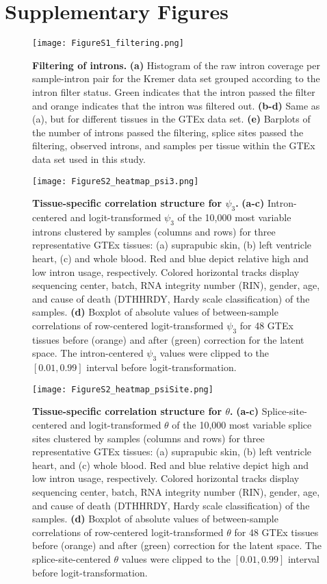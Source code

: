 \documentclass[a4paper,12pt]{article}
\begin{document}
\section{Supplementary Figures}

\begin{figure}[h]
    \centering
    \texttt{[image: FigureS1\_filtering.png]}
    \caption{
        \textbf{Filtering of introns.}
        \textbf{(a)} Histogram of the raw intron coverage per sample-intron pair
for the Kremer data set grouped according to the intron filter status. Green
indicates that the intron passed the filter and orange indicates that the
intron was filtered out. \textbf{(b-d)} Same as (a), but for different tissues
in the GTEx data set. \textbf{(e)} Barplots of the number of introns passed
the filtering, splice sites passed the filtering, observed introns, and
samples per tissue within the GTEx data set used in this study.}
\end{figure}
\pagebreak


\begin{figure}[h]
	\centering
 	\texttt{[image: FigureS2\_heatmap\_psi3.png]}
 	\caption{
 	    \textbf{Tissue-specific correlation structure for $\psi_3$.}
 	    \textbf{(a-c)} Intron-centered and logit-transformed $\psi_3$ of the 
10,000 most variable introns clustered by samples (columns and rows)
for three representative GTEx tissues: (a) suprapubic skin, (b)
left ventricle heart, (c) and whole blood. Red and blue depict relative high and 
low intron usage, respectively. Colored horizontal tracks display sequencing
center, batch, RNA integrity number (RIN), gender, age, and cause of death 
(DTHHRDY, Hardy scale classification) of the samples. \textbf{(d)} Boxplot of
absolute values of between-sample correlations of row-centered logit-transformed
$\psi_3$ for 48 GTEx tissues before (orange) and after (green) correction 
for the latent space. The intron-centered $\psi_3$ values were clipped to the 
$[0.01, 0.99]$ interval before logit-transformation.
}
\end{figure}
\pagebreak

\begin{figure}[h]
	\centering
	\texttt{[image: FigureS2\_heatmap\_psiSite.png]}
	\caption{
	    \textbf{Tissue-specific correlation structure for $\theta$.}
	    \textbf{(a-c)} Splice-site-centered and logit-transformed $\theta$
of the 10,000 most variable splice sites clustered by samples (columns and rows)
for three representative GTEx tissues: (a) suprapubic skin, (b)
left ventricle heart, and (c) whole blood. Red and blue relative depict high and 
low intron usage, respectively. Colored horizontal tracks display sequencing
center, batch, RNA integrity number (RIN), gender, age, and cause of death 
(DTHHRDY, Hardy scale classification) of the samples. \textbf{(d)} Boxplot of 
absolute values of between-sample correlations of row-centered logit-transformed
$\theta$ for 48 GTEx tissues before (orange) and after (green) correction 
for the latent space. The splice-site-centered $\theta$ values were 
clipped to the $[0.01, 0.99]$ interval before logit-transformation.
}
\end{figure}
\pagebreak
\end{document}
